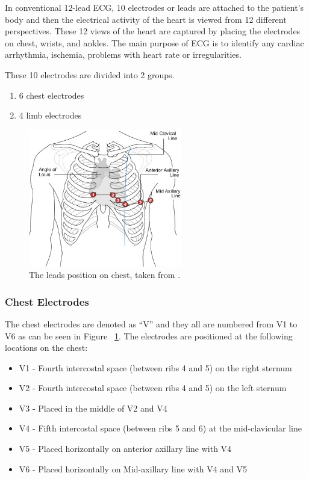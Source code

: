 In conventional 12-lead ECG, 10 electrodes or leads are attached to the patient's body and then the electrical activity of the heart is viewed from 12 different perspectives. These 12 views of the heart are captured by placing the electrodes on chest, wrists, and ankles. The main purpose of ECG is to identify any cardiac arrhythmia, ischemia, problems with heart rate or irregularities.

These 10 electrodes are divided into 2 groups. 
\begin{enumerate}
	\item 6 chest electrodes
	\item 4 limb electrodes
\end{enumerate}

\begin{figure}[htpb]
	\centering
	\includegraphics[width=\textwidth,height=6cm,keepaspectratio=true]{images/6_lead_placement}
	\caption{
		The leads position on chest, taken from \cite{TUON:six_leads}.
	}
	\label{fig:6_lead_placement}
\end{figure}


\subsubsection{Chest Electrodes}
The chest electrodes are denoted as ``V'' and they all are numbered from V1 to V6 as can be seen in Figure ~\ref{fig:6_lead_placement}. The electrodes are positioned at the following locations on the chest:

\begin{itemize}
	\item V1 - Fourth intercostal space (between ribs 4 and 5) on the right sternum
	\item V2 - Fourth intercostal space (between ribs 4 and 5) on the left sternum
	\item V3 - Placed in the middle of V2 and V4
	\item V4 - Fifth intercostal space (between ribs 5 and 6) at the mid-clavicular line
	\item V5 - Placed horizontally on anterior axillary line with V4
	\item V6 - Placed horizontally on Mid-axillary line with V4 and V5
\end{itemize} 


